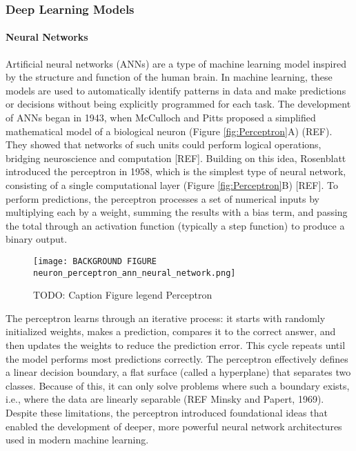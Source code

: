 \documentclass{report}
\begin{document}
\subsubsection{Deep Learning Models}
\paragraph{Neural Networks}

Artificial neural networks (ANNs) are a type of machine learning model inspired by the structure and function of the human brain. In machine learning, these models are used to automatically identify patterns in data and make predictions or decisions without being explicitly programmed for each task. The development of ANNs began in 1943, when McCulloch and Pitts proposed a simplified mathematical model of a biological neuron (Figure \ref{fig:Perceptron}A) (REF). They showed that networks of such units could perform logical operations, bridging neuroscience and computation [REF]. Building on this idea, Rosenblatt introduced the perceptron in 1958, which is the simplest type of neural network, consisting of a single computational layer (Figure \ref{fig:Perceptron}B) [REF]. To perform predictions, the perceptron processes a set of numerical inputs by multiplying each by a weight, summing the results with a bias term, and passing the total through an activation function (typically a step function) to produce a binary output.

\begin{figure}
    \centering
    \texttt{[image: BACKGROUND FIGURE neuron\_perceptron\_ann\_neural\_network.png]}
    \caption{TODO: Caption Figure legend Perceptron}
    \label{fig:Perceptron }
\end{figure}

The perceptron learns through an iterative process: it starts with randomly initialized weights, makes a prediction, compares it to the correct answer, and then updates the weights to reduce the prediction error. This cycle repeats until the model performs most predictions correctly. The perceptron effectively defines a linear decision boundary, a flat surface (called a hyperplane) that separates two classes. Because of this, it can only solve problems where such a boundary exists, i.e., where the data are linearly separable (REF Minsky and Papert, 1969). Despite these limitations, the perceptron introduced foundational ideas that enabled the development of deeper, more powerful neural network architectures used in modern machine learning.
\end{document}
